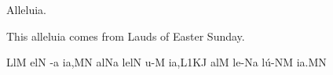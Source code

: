 
\beginhymn Alleluia.

This alleluia comes from Lauds of Easter Sunday.

\smallskip

\Internote
\initiumgregorianum
{}%
\sgn {}Ll\punctum M\egn
\sgn {}el\punctum N\egn
{}-\punctum a\egn
\sgn ia,\punctum M\augmentum N\egn
\spatium
\Asteriscus
\divisiominima
\spatium
\sgn {}al\pes Na\egn
\sgn lel\punctum N\egn
\sgn {}u-\punctum M\egn
\sgn ia,\episem L1\clivis KJ\egn
\spatium
\divisiominima
\spatium
\sgn {}al\punctum M\egn
\sgn le-\pes Na\egn
\sgn l{\'u}-\cephalicus NM\egn
\sgn ia.\punctum M\augmentum N\egn
\spatium
\Finisgregoriana

